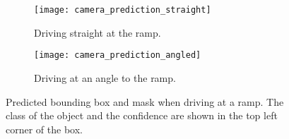\begin{figure}[htb]
	\centering
	\begin{subfigure}{1\textwidth}
		\centering
		\texttt{[image: camera\_prediction\_straight]}
		\caption{Driving straight at the ramp.}
		\label{fig:camera_prediction_straight}
	\end{subfigure}

	\begin{subfigure}{1\textwidth}
		\centering
		\texttt{[image: camera\_prediction\_angled]}
		\caption{Driving at an angle to the ramp.}
		\label{fig:camera_prediction_angled}
	\end{subfigure}
	\caption[Visualization examples of predicted segmentation masks]{Predicted bounding box and mask when driving at a ramp. The class of the object and the confidence are shown in the top left corner of the box.}
\end{figure}


